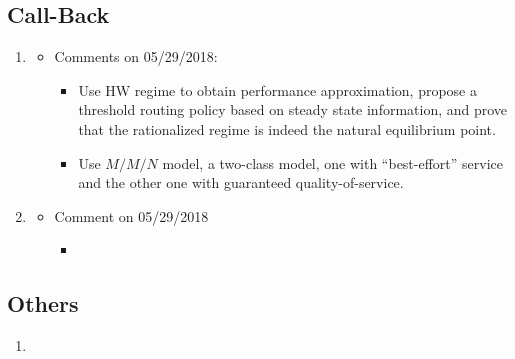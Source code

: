 \subsection{Call-Back}
\begin{enumerate}
    \item \citet{Armony2004OnDesign}
    \begin{itemize}
        \item Comments on 05/29/2018:
            \begin{itemize}
                \item Use HW regime to obtain performance approximation, propose a threshold routing policy based on steady state information, and prove that the rationalized regime is indeed the natural equilibrium point.
                \item Use $M/M/N$ model, a two-class model, one with ``best-effort'' service and the other one with guaranteed quality-of-service. 
            \end{itemize}
    \end{itemize}
    
    \item \citet{Armony2004ContactInformation}
    \begin{itemize}
        \item Comment on 05/29/2018
        \begin{itemize}
            \item 
        \end{itemize}
    \end{itemize}
\end{enumerate}

\subsection{Others}
\begin{enumerate}
    \item \citet{Gans2015ParametricScheduling}
\end{enumerate}